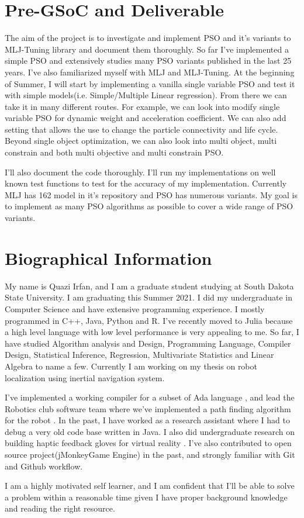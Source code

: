 \documentclass{article}
\begin{document}
\section{Pre-GSoC and Deliverable}
The aim of the project is to investigate and implement PSO and it's variants to MLJ-Tuning library and document them thoroughly. So far I've implemented a simple PSO and extensively studies many PSO variants published in the last 25 years. I've also familiarized myself with MLJ and MLJ-Tuning. At the beginning of Summer, I will start by implementing a vanilla single variable PSO and test it with simple models(i.e. Simple/Multiple Linear regression). From there we can take it in many different routes. For example, we can look into modify single variable PSO for dynamic weight and acceleration coefficient. We can also add setting that allows the use to change the particle connectivity and life cycle. Beyond single object optimization, we can also look into multi object, multi constrain and both multi objective and multi constrain PSO.

I'll also document the code thoroughly. I'll run my implementations on well known test functions to test for the accuracy of my implementation. Currently MLJ has 162 model in it's repository and PSO has numerous variants. My goal is to implement as many PSO algorithms as possible to cover a wide range of PSO variants.


\section{Biographical Information}
My name is Quazi Irfan, and I am a graduate student studying at South Dakota State University. I am graduating this Summer 2021. I did my undergraduate in Computer Science and have extensive programming experience. I mostly programmed in C++, Java, Python and R. I've recently moved to Julia because a high level language with low level performance is very appealing to me. So far, I have studied Algorithm analysis and Design, Programming Language, Compiler Design, Statistical Inference, Regression, Multivariate Statistics and Linear Algebra to name a few. Currently I am working on my thesis on robot localization using inertial navigation system.

I've implemented a working compiler for a subset of Ada language \cite{quazi_2021}, and lead the Robotics club software team where we've implemented a path finding algorithm for the robot \cite{irfan}. In the past, I have worked as a research assistant where I had to debug a very old code base written in Java. I also did undergraduate research on building haptic feedback gloves for virtual reality \cite{irfan2018building}. I've also contributed to open source project(jMonkeyGame Engine) in the past, and strongly familiar with Git and Github workflow.

I am a highly motivated self learner, and I am confident that I'll be able to solve a problem within a reasonable time given I have proper background knowledge and reading the right resource.

\pagebreak
\printbibliography
\end{document}
